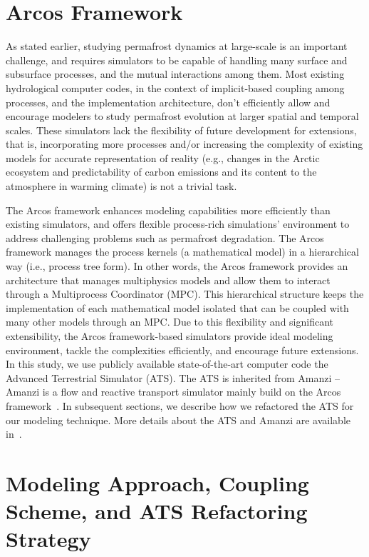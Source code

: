 \documentclass[review]{elsarticle}
\begin{document}
\section{Arcos Framework}\label{arcos-framework}

As stated earlier, studying permafrost dynamics at large-scale is an important challenge, and requires simulators to be capable of handling many surface and subsurface processes, and the mutual interactions among them. Most existing hydrological computer codes, in the context of implicit-based coupling among processes, and the implementation architecture, don't efficiently allow and encourage modelers to study permafrost evolution at larger spatial and temporal scales. These simulators lack the flexibility of future development for extensions, that is, incorporating more processes and/or increasing the complexity of existing models for accurate representation of reality (e.g., changes in the Arctic ecosystem and predictability of carbon emissions and its content to the atmosphere in warming climate) is not a trivial task.

The Arcos framework enhances modeling capabilities more efficiently than existing simulators, and offers flexible process-rich simulations' environment to address challenging problems such as permafrost degradation. The Arcos framework manages the process kernels (a mathematical model) in a hierarchical way (i.e., process tree form). In other words, the Arcos framework provides an architecture that manages multiphysics models and allow them to interact through a Multiprocess Coordinator (MPC). This hierarchical structure keeps the implementation of each mathematical model isolated that can be coupled with many other models through an MPC. Due to this flexibility and significant extensibility, the Arcos framework-based simulators provide ideal modeling environment, tackle the complexities efficiently, and encourage future extensions. 
In this study, we use publicly available state-of-the-art computer code the Advanced Terrestrial Simulator (ATS). The ATS is inherited from Amanzi -- Amanzi is a flow and reactive transport simulator mainly build on the Arcos framework~\cite{moulton2012high}. In subsequent sections, we describe how we refactored the ATS for our modeling technique. More details about the ATS and Amanzi are available in~\cite{ecoon2016managing, moulton2012high, spainter2016integrated}.


\section{Modeling Approach, Coupling Scheme, and ATS Refactoring Strategy}\label{mixed-dim-model}
\end{document}
